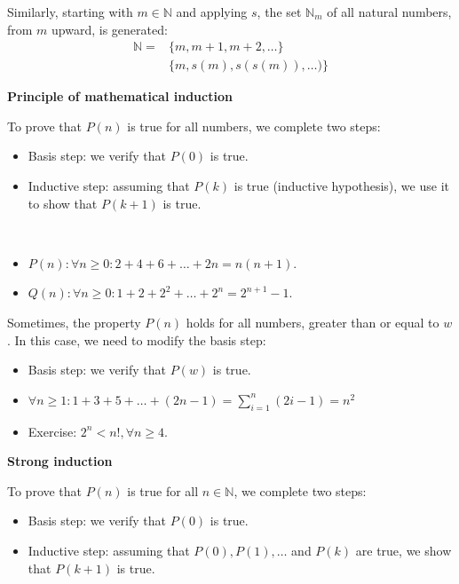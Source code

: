 \documentclass[12pt, a4paper]{book}
\begin{document}
Similarly, starting with $m\in\mathbb{N}$ and applying $s$, the set $\mathbb{N}_m$ of all natural numbers, from $m$ upward, is generated:
\[
    \begin{aligned}
        \mathbb{N} = &\{m,m+1,m+2,\ldots\} \\
        &\{m,s(m),s(s(m)),\ldots)\}
    \end{aligned}
\]

\begin{defn}
    \textbf{Principle of mathematical induction}

    To prove that $P(n)$ is true for all numbers, we complete two steps:
    \begin{itemize}
        \item Basis step: we verify that $P(0)$ is true.
        \item Inductive step: assuming that $P(k)$ is true (inductive hypothesis), we use it to show that $P(k+1)$ is true. \newline
    \end{itemize}
\end{defn}

\begin{exmp} \ 
    \begin{itemize}
        \item $P(n): \forall n \geq 0: 2+4+6+\ldots +2n = n(n+1)$.
        \item $Q(n): \forall n \geq 0: 1+2+2^2+\ldots + 2^n = 2^{n+1}-1$.
    \end{itemize}
\end{exmp}

Sometimes, the property $P(n)$ holds for all numbers, greater than or equal to $w$. In this case, we need to modify the basis step:

\begin{itemize}
    \item Basis step: we verify that $P(w)$ is true.
\end{itemize} 

\begin{itemize}
    \item $\forall n \geq 1: 1+3+5+\ldots +(2n-1) = \sum_{i = 1}^{n}(2i-1) = n^2$
    \item Exercise: $2^n < n!, \forall n \geq 4$.
\end{itemize}

\begin{defn}
    \textbf{Strong induction}

    To prove that $P(n)$ is true for all $n\in\mathbb{N}$, we complete two steps:
    \begin{itemize}
        \item Basis step: we verify that $P(0)$ is true.
        \item Inductive step: assuming that $P(0),P(1),\ldots$ and $P(k)$ are true, we show that $P(k+1)$ is true.
    \end{itemize}
\end{defn}
\end{document}
